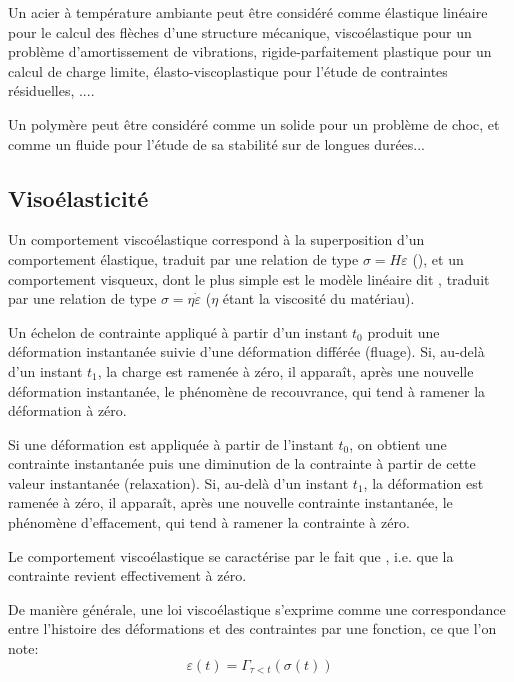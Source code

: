 Un acier à température ambiante peut être considéré comme élastique linéaire pour le calcul des 
flèches d'une structure mécanique, viscoélastique pour un problème d'amortissement de vibrations,
rigide-parfaitement plastique pour un calcul de charge limite, élasto-viscoplastique pour l'étude de 
contraintes résiduelles, ....

Un polymère peut être considéré comme un solide pour un problème de choc, et comme un fluide 
pour l'étude de sa stabilité sur de longues durées...




\medskip
\subsection{Visoélasticité}

Un comportement viscoélastique correspond à la superposition d'un comportement
élastique, traduit par une relation de type $\sigma = H\varepsilon$ (), 
et un comportement visqueux, dont le plus simple est le modèle linéaire dit , 
traduit par une relation de type $\sigma=\eta\dot{\varepsilon}$ ($\eta$ étant la viscosité
du matériau).

\medskip
Un échelon de contrainte appliqué à partir d'un instant $t_0$ produit une déformation instantanée
suivie d'une déformation différée (fluage).
Si, au-delà d'un instant $t_1$, la charge est ramenée à zéro, il apparaît, après une nouvelle déformation
instantanée, le phénomène de recouvrance, qui tend à ramener la déformation à zéro. 

Si une déformation est appliquée à partir de l'instant $t_0$, on obtient une contrainte instantanée
puis une diminution de la contrainte à partir de cette valeur instantanée (relaxation).
Si, au-delà d'un instant $t_1$, la déformation est ramenée à zéro, il apparaît, après une nouvelle contrainte
instantanée, le phénomène d'effacement, qui tend à ramener la contrainte à zéro. 

Le comportement viscoélastique se caractérise par le fait que , i.e. que la contrainte revient effectivement à zéro. 

\medskip
De manière générale, une loi viscoélastique s'exprime comme une correspondance entre l'histoire
des déformations et des contraintes par une fonction, ce que l'on note:
\begin{equation} \varepsilon(t) =\Gamma_{\tau<t}(\sigma(t)) \end{equation}

